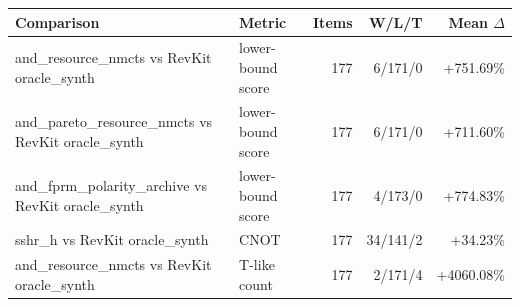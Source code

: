 \begin{tabular}{llrrr}
\toprule
Comparison & Metric & Items & W/L/T & Mean $\Delta$ \\
\midrule
and\_resource\_nmcts vs RevKit oracle\_synth & lower-bound score & 177 & 6/171/0 & +751.69\% \\
and\_pareto\_resource\_nmcts vs RevKit oracle\_synth & lower-bound score & 177 & 6/171/0 & +711.60\% \\
and\_fprm\_polarity\_archive vs RevKit oracle\_synth & lower-bound score & 177 & 4/173/0 & +774.83\% \\
sshr\_h vs RevKit oracle\_synth & CNOT & 177 & 34/141/2 & +34.23\% \\
and\_resource\_nmcts vs RevKit oracle\_synth & T-like count & 177 & 2/171/4 & +4060.08\% \\
\bottomrule
\end{tabular}

